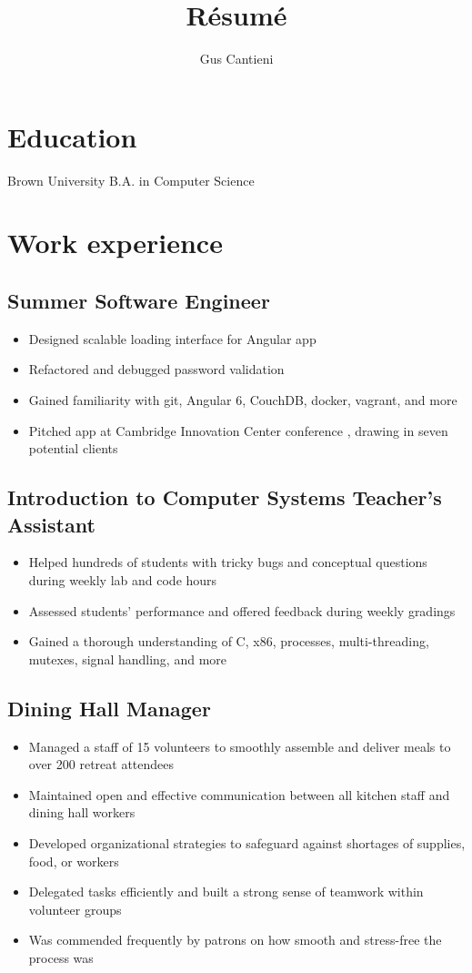 \documentclass[10pt]{article}
\title{R\'esum\'e}
\author{Gus Cantieni}
\renewcommand{\maketitle}{}
\begin{document}
\maketitle
\section{Education}
Brown University B.A. in Computer Science

\section{Work experience}
\subsection{Summer Software Engineer}
\begin{itemize}
	\item Designed scalable loading interface for Angular app 
	\item Refactored and debugged password validation 
	\item Gained familiarity with git, Angular 6, CouchDB, docker, vagrant, and more
	\item Pitched app at Cambridge Innovation Center conference , drawing in seven potential clients
\end{itemize}
\subsection{Introduction to Computer Systems Teacher's Assistant
}
\begin{itemize}
	\item Helped hundreds of students with tricky bugs and conceptual questions during weekly lab and code hours
	\item Assessed students' performance and offered feedback during weekly gradings
	\item Gained a thorough understanding of C, x86, processes, multi-threading, mutexes, signal handling, and more 
\end{itemize}

\subsection{Dining Hall Manager}
\begin{itemize}
	\item Managed a staff of 15 volunteers to smoothly assemble and deliver meals to over 200 retreat attendees  
	\item Maintained open and effective communication between all kitchen staff and dining hall workers
	\item Developed organizational strategies to safeguard against shortages of supplies, food, or workers
	\item Delegated tasks efficiently and built a strong sense of teamwork within volunteer groups
	\item Was commended frequently by patrons on how smooth and stress-free the process was
\end{itemize}
\end{document}
